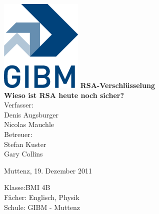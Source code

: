 \begin{titlepage}
\sffamily
\centering
\includegraphics{images/gibm_logo.png}
\vfill
{\bfseries\Huge RSA-Verschlüsselung}\\
\vfill
{\bfseries\Large Wieso ist RSA heute noch sicher?}\\
\vfill
Verfasser:\\[1ex]
Denis Augsburger\\
Nicolas Mauchle\\
\vfill
Betreuer:\\[1ex]
{\large Stefan Kuster}\\
{\large Gary Collins}\\
\vfill
\raggedright
\small
Muttenz, 19. Dezember 2011\\[2cm]
\begin{tabbing}
Klasse:\quad\quad\quad \=BMI 4B\\
Fächer: \> Englisch, Physik \\
Schule: \> GIBM - Muttenz
\end{tabbing}
\end{titlepage}
